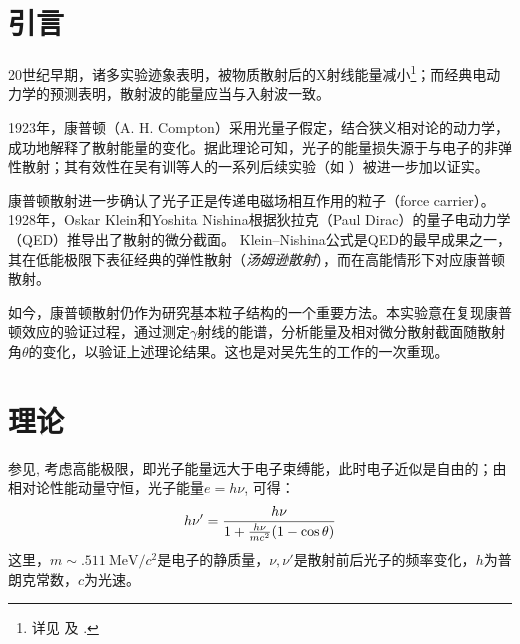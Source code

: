 \documentclass[aps,pre,12pt,preprint,%
	onecolumn,showpacs,showkeys,nofootinbib]{revtex4-1}
\begin{document}
\section{引言}
	20世纪早期，诸多实验迹象表明，被物质散射后的X射线能量减小\footnote{%
		详见 \cite{taylor2004modern} 及 \cite{textbook}. 
	}；而经典电动力学的预测表明，散射波的能量应当与入射波一致。
	
	1923年，康普顿（A. H. Compton）采用光量子假定，结合狭义相对论的动力学，成功地解释了散射能量的变化\supercite{compton1923quantum}。据此理论可知，光子的能量损失源于与电子的非弹性散射；其有效性在吴有训等人的一系列后续实验（如 \cite{woo1926distribution}）被进一步加以证实。
	
	康普顿散射进一步确认了光子正是传递电磁场相互作用的粒子（force carrier）。1928年，Oskar Klein和Yoshita Nishina根据狄拉克（Paul Dirac）的量子电动力学（QED）推导出了散射的微分截面。
	Klein--Nishina公式是QED的最早成果之一，其在低能极限下表征经典的弹性散射（\textit{汤姆逊散射}），而在高能情形下对应康普顿散射。
	
	如今，康普顿散射仍作为研究基本粒子结构的一个重要方法。本实验意在复现康普顿效应的验证过程，通过测定$\gamma$射线的能谱，分析能量及相对微分散射截面随散射角$\theta$的变化，以验证上述理论结果。这也是对吴先生的工作的一次重现。
\section{理论}
	参见\cite{compton1923quantum}, 考虑高能极限，即光子能量远大于电子束缚能，此时电子近似是自由的；由相对论性能动量守恒，光子能量$e = h\nu$, 可得：
	\begin{equation}
		h\nu' = \frac{h\nu}
			{1 + \frac{h\nu}{mc^2}
				\pqty{1 - \cos\theta}}
	\end{equation}
	这里，$m \sim \SI{.511}{\MeV/c^2}$是电子的静质量，$\nu,\nu'$是散射前后光子的频率变化，$h$为普朗克常数，$c$为光速。%
\clearpage
	
\end{document}
